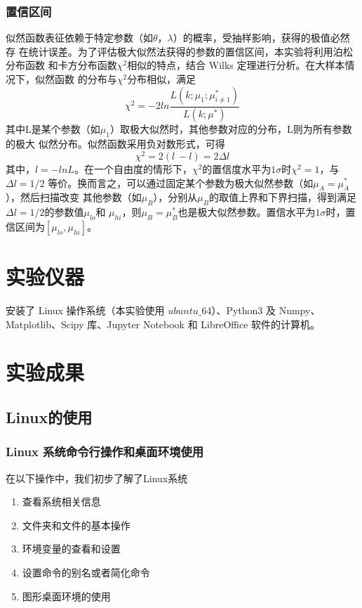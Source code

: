 \documentclass[10pt,a4paper,twoside,UTF8]{ctexart}
\begin{document}
\subsubsection{置信区间}
似然函数表征依赖于特定参数（如$\theta$，$\lambda$）的概率，受抽样影响，获得的极值必然存
在统计误差。为了评估极大似然法获得的参数的置信区间，本实验将利用泊松分布函数
和卡方分布函数$\chi^{2}$相似的特点，结合 Wilks 定理进行分析。在大样本情况下，似然函数
的分布与$\chi^{2}$分布相似，满足
\begin{equation}
	\chi^2=-2ln \frac{L(k;\mu_1;\mu_{i\neq 1}^{*})}{L(k;\mu^{*})}
\end{equation}
其中L是某个参数（如$\mu_1$）取极大似然时，其他参数对应的分布，L则为所有参数的极大
似然分布。似然函数采用负对数形式，可得
\begin{equation}
	\chi^2=2(l^{~}-l)=2\varDelta l
\end{equation}
其中，$l = -lnL$。在一个自由度的情形下，$\chi^2$的置信度水平为$1\sigma$时$\chi^2=1$，与$\varDelta l=1/2$
等价。换而言之，可以通过固定某个参数为极大似然参数（如$\mu_A=\mu_{A}^{*}$），然后扫描改变
其他参数（如$\mu_B$），分别从$\mu_B$的取值上界和下界扫描，得到满足$\varDelta l=1/2$的参数值$\mu_{lo}$和
$\mu_{hi}$，则$\mu_B=\mu_{B}^{*}$也是极大似然参数。置信水平为$1\sigma$时，置信区间为$[\mu_{lo},\mu_{hi}]$。

\section{实验仪器}
安装了 Linux 操作系统（本实验使用 $ubuntu\_64$）、Python3 及 Numpy、Matplotlib、Scipy 库、Jupyter Notebook 和
LibreOffice 软件的计算机。

\section{实验成果}
\subsection{Linux的使用}
\subsubsection{Linux 系统命令行操作和桌面环境使用}
在以下操作中，我们初步了解了Linux系统
\begin{enumerate}
	\item  查看系统相关信息
	\item  文件夹和文件的基本操作
	\item  环境变量的查看和设置
	\item  设置命令的别名或者简化命令
	\item  图形桌面环境的使用
\end{enumerate}
\end{document}

